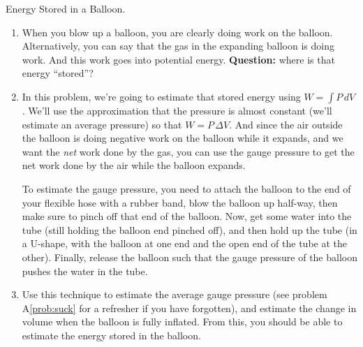 \begin{aproblem}{ Energy Stored in a Balloon.}
  \begin{enumerate}
  \item When you blow up a balloon, you are clearly doing work on the
    balloon.  Alternatively, you can say that the gas in the expanding
    balloon is doing work.  And this work goes into potential energy.
    {\bf Question:} where is that energy ``stored''?

  \item In this problem, we're going to estimate that stored energy
    using $W = \int P\, dV$.  We'll use the approximation that the
    pressure is almost constant (we'll estimate an average pressure)
    so that $W= P\, \Delta V$.  And since the air outside the balloon
    is doing negative work on the balloon while it expands, and we
    want the {\em net} work done by the gas, you can use the gauge
    pressure to get the net work done by the air while the balloon
    expands.

    To estimate the gauge pressure, you need to attach the balloon to
    the end of your flexible hose with a rubber band, blow the balloon
    up half-way, then make sure to pinch off that end of the balloon.
    Now, get some water into the tube (still holding the balloon end
    pinched off), and then hold up the tube (in a U-shape, with the
    balloon at one end and the open end of the tube at the other).
    Finally, release the balloon such that the gauge pressure of the
    balloon pushes the water in the tube.

  \item Use this technique to estimate the average gauge pressure (see
    problem A\ref{prob:suck} for a refresher if you have forgotten),
    and estimate the change in volume when the balloon is fully
    inflated.  From this, you should be able to estimate the energy
    stored in the balloon.
  \end{enumerate}
\end{aproblem}



